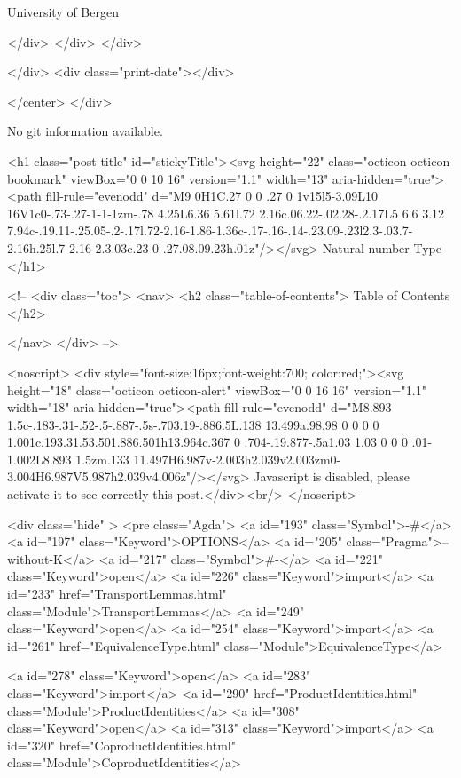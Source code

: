                   University of Bergen
                
                </div>
            </div>
          </div>
          
          
        </div>
        <div class="print-date"></div>
        
        
    </center>
  </div>

  
  No git information available.
  
  <h1 class="post-title" id="stickyTitle"><svg height="22" class="octicon octicon-bookmark" viewBox="0 0 10 16" version="1.1" width="13" aria-hidden="true"><path fill-rule="evenodd" d="M9 0H1C.27 0 0 .27 0 1v15l5-3.09L10 16V1c0-.73-.27-1-1-1zm-.78 4.25L6.36 5.61l.72 2.16c.06.22-.02.28-.2.17L5 6.6 3.12 7.94c-.19.11-.25.05-.2-.17l.72-2.16-1.86-1.36c-.17-.16-.14-.23.09-.23l2.3-.03.7-2.16h.25l.7 2.16 2.3.03c.23 0 .27.08.09.23h.01z"/></svg> Natural number Type
  </h1>

  <!-- 
  <div class="toc">
    <nav>
    <h2 class="table-of-contents"> Table of Contents </h2>
      

    </nav>
  </div>
   -->

  <noscript>
  <div style="font-size:16px;font-weight:700; color:red;"><svg height="18" class="octicon octicon-alert" viewBox="0 0 16 16" version="1.1" width="18" aria-hidden="true"><path fill-rule="evenodd" d="M8.893 1.5c-.183-.31-.52-.5-.887-.5s-.703.19-.886.5L.138 13.499a.98.98 0 0 0 0 1.001c.193.31.53.501.886.501h13.964c.367 0 .704-.19.877-.5a1.03 1.03 0 0 0 .01-1.002L8.893 1.5zm.133 11.497H6.987v-2.003h2.039v2.003zm0-3.004H6.987V5.987h2.039v4.006z"/></svg> Javascript is disabled, please activate it to see correctly this post.</div><br/>
  </noscript>

  <div class="hide" >
<pre class="Agda">
<a id="193" class="Symbol">{-#</a> <a id="197" class="Keyword">OPTIONS</a> <a id="205" class="Pragma">--without-K</a> <a id="217" class="Symbol">#-}</a>
<a id="221" class="Keyword">open</a> <a id="226" class="Keyword">import</a> <a id="233" href="TransportLemmas.html" class="Module">TransportLemmas</a>
<a id="249" class="Keyword">open</a> <a id="254" class="Keyword">import</a> <a id="261" href="EquivalenceType.html" class="Module">EquivalenceType</a>

<a id="278" class="Keyword">open</a> <a id="283" class="Keyword">import</a> <a id="290" href="ProductIdentities.html" class="Module">ProductIdentities</a>
<a id="308" class="Keyword">open</a> <a id="313" class="Keyword">import</a> <a id="320" href="CoproductIdentities.html" class="Module">CoproductIdentities</a>

